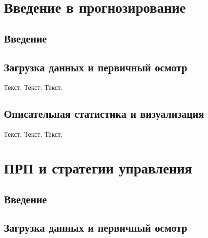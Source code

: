 \documentclass[
  letterpaper,
  DIV=11,
  numbers=noendperiod]{scrreprt}
\begin{document}

\chapter{Введение в
прогнозирование}\label{ux432ux432ux435ux434ux435ux43dux438ux435-ux432-ux43fux440ux43eux433ux43dux43eux437ux438ux440ux43eux432ux430ux43dux438ux435}

\section{Введение}\label{ux432ux432ux435ux434ux435ux43dux438ux435-6}

\section{Загрузка данных и первичный
осмотр}\label{ux437ux430ux433ux440ux443ux437ux43aux430-ux434ux430ux43dux43dux44bux445-ux438-ux43fux435ux440ux432ux438ux447ux43dux44bux439-ux43eux441ux43cux43eux442ux440-4}

Текст. Текст. Текст.

\section{Описательная статистика и
визуализация}\label{ux43eux43fux438ux441ux430ux442ux435ux43bux44cux43dux430ux44f-ux441ux442ux430ux442ux438ux441ux442ux438ux43aux430-ux438-ux432ux438ux437ux443ux430ux43bux438ux437ux430ux446ux438ux44f-5}

Текст. Текст. Текст.


\chapter{ПРП и стратегии
управления}\label{ux43fux440ux43f-ux438-ux441ux442ux440ux430ux442ux435ux433ux438ux438-ux443ux43fux440ux430ux432ux43bux435ux43dux438ux44f}

\section{Введение}\label{ux432ux432ux435ux434ux435ux43dux438ux435-7}

\section{Загрузка данных и первичный
осмотр}\label{ux437ux430ux433ux440ux443ux437ux43aux430-ux434ux430ux43dux43dux44bux445-ux438-ux43fux435ux440ux432ux438ux447ux43dux44bux439-ux43eux441ux43cux43eux442ux440-5}
\end{document}

